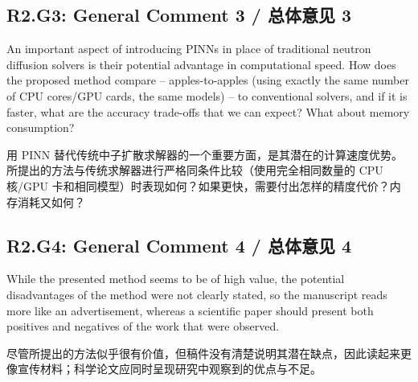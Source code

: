 \documentclass[11pt,a4paper,twoside]{article}
\begin{document}
\subsection{R2.G3: General Comment 3 / 总体意见 3}
\begin{englishcomment}
An important aspect of introducing PINNs in place of traditional neutron diffusion solvers is their potential advantage in computational speed. How does the proposed method compare -- apples-to-apples (using exactly the same number of CPU cores/GPU cards, the same models) -- to conventional solvers, and if it is faster, what are the accuracy trade-offs that we can expect? What about memory consumption?
\end{englishcomment}
\begin{chinesecomment}
用 PINN 替代传统中子扩散求解器的一个重要方面，是其潜在的计算速度优势。所提出的方法与传统求解器进行严格同条件比较（使用完全相同数量的 CPU 核/GPU 卡和相同模型）时表现如何？如果更快，需要付出怎样的精度代价？内存消耗又如何？
\end{chinesecomment}
\begin{revisionidea}
\end{revisionidea}

\subsection{R2.G4: General Comment 4 / 总体意见 4}
\begin{englishcomment}
While the presented method seems to be of high value, the potential disadvantages of the method were not clearly stated, so the manuscript reads more like an advertisement, whereas a scientific paper should present both positives and negatives of the work that were observed.
\end{englishcomment}
\begin{chinesecomment}
尽管所提出的方法似乎很有价值，但稿件没有清楚说明其潜在缺点，因此读起来更像宣传材料；科学论文应同时呈现研究中观察到的优点与不足。
\end{chinesecomment}
\begin{revisionidea}
\end{revisionidea}

\end{document}
